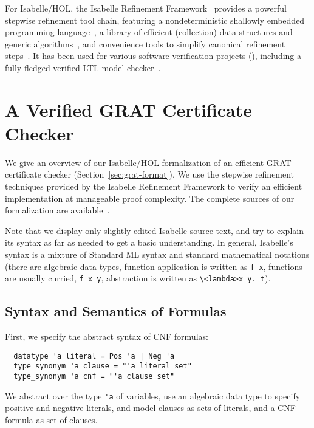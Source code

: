 \documentclass{llncs}
\newcommand{\isai}{\lstinline[language=isabelle,basicstyle=\normalsize\ttfamily\slshape]}
\begin{document}
For Isabelle/HOL, the Isabelle Refinement Framework~\cite{LaTu12,La13,La15,La16} provides a powerful stepwise refinement tool chain, 
featuring a nondeterministic shallowly embedded programming language~\cite{LaTu12}, a library of efficient (collection) data structures and generic algorithms~\cite{LL10,La15,La16},
and convenience tools to simplify canonical refinement steps~\cite{La13,La15}. It has been used for various software verification projects (\eg \cite{La14,LaSe16,LaNe15}), 
including a fully fledged verified LTL model checker~\cite{ELNN13,BrLa16}.

\section{A Verified GRAT Certificate Checker}\label{sec:grat_verified}
We give an overview of our Isabelle/HOL formalization of an efficient GRAT certificate checker (\cf Section~\ref{sec:grat-format}).
We use the stepwise refinement techniques provided by the Isabelle Refinement Framework to verify an efficient implementation at manageable proof complexity.
The complete sources of our formalization are available~\cite{??}. 

Note that we display only slightly edited Isabelle source text, and try to explain its syntax as far as needed to get a basic understanding.
In general, Isabelle's syntax is a mixture of Standard ML syntax and standard mathematical notations (\eg there are algebraic data types, function application is written as 
\isai$f x$, functions are usually curried, \eg \isai$f x y$, abstraction is written as \isai$\<lambda>x y. t$).


\subsection{Syntax and Semantics of Formulas}
First, we specify the abstract syntax of CNF formulas:
\begin{lstlisting}
  datatype 'a literal = Pos 'a | Neg 'a
  type_synonym 'a clause = "'a literal set"
  type_synonym 'a cnf = "'a clause set"
\end{lstlisting}
We abstract over the type \isai$'a$ of variables, use an algebraic data type to specify positive and negative literals, and model clauses 
as sets of literals, and a CNF formula as set of clauses. 
% 
% 
\end{document}

